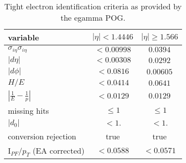 \begin{table}[ht]
    \centering
    \setlength{\tabcolsep}{2em}
    \renewcommand{\arraystretch}{1.25}
    \caption{Tight electron identification criteria as provided by the egamma POG.}
    \label{tab:slt:electron_id}

    \begin{tabular}{l|c|c}
        \hline
        variable                          & $|\eta| < 1.4446$ & $|\eta| \geq 1.566$ \\
        \hline
        $\sigma_{i\eta}\sigma_{i\eta}$    & $<0.00998$        & $0.0394$            \\
        $|d\eta|$                         & $<0.00308$        & $0.0292$            \\
        $|d\phi|$                         & $<0.0816$         & $0.00605$           \\
        $H/E$                             & $<0.0414$         & $0.0641$            \\
        $|\frac{1}{E} - \frac{1}{p}|$     & $<0.0129$         & $0.0129$            \\
        missing hits                      & $\leq 1$          & $\leq 1$            \\
        $|d_{0}|$                         & $<1.$             & $<1.$               \\
        \hline
        conversion rejection              & true              & true                \\
        I$_{PF}$/$p_{T}$ (EA corrected) & $< 0.0588$        & $<0.0571$           \\
        \hline
    \end{tabular}
\end{table}